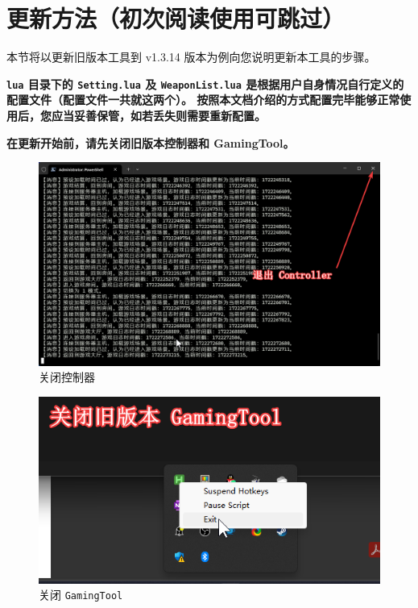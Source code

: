 \section{更新方法（初次阅读使用可跳过）}

本节将以更新旧版本工具到 v1.3.14 版本为例向您说明更新本工具的步骤。

\textbf{\color{red}\lstinline{lua} 目录下的 \lstinline{Setting.lua} 及 \lstinline{WeaponList.lua} 是根据用户自身情况自行定义的配置文件（配置文件一共就这两个）。
按照本文档介绍的方式配置完毕能够正常使用后，您应当妥善保管，如若丢失则需要重新配置。}

\textbf{\color{red}在更新开始前，请先关闭旧版本控制器和 GamingTool。}

\begin{figure}[H]
    \Centering
    \includegraphics[width=\textwidth]{docs/assets/update/close_controller.png}
    \caption{关闭控制器}
\end{figure}


\begin{figure}[H]
    \Centering
    \includegraphics[width=\textwidth]{docs/assets/update/close_gamingtool.png}
    \caption{关闭 \lstinline{GamingTool}}
\end{figure}

